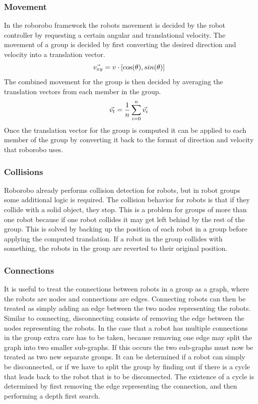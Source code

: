 	\subsubsection{Movement}
	In the roborobo framework the robots movement is decided by the robot controller by requesting a certain angular and translational velocity.
	The movement of a group is decided by first converting the desired direction and velocity into a translation vector.
	\begin{equation}
		\centering
		\vec{v_{xy}} = v\cdot[\cos(\theta), sin(\theta)]
	\end{equation}
	The combined movement for the group is then decided by averaging the translation vectors from each member in the group.
	\begin{equation}
		\centering
		\vec{v_t} = \frac{1}{n}\sum_{i=0}^{n} \vec{v_{i}}
	\end{equation}
	Once the translation vector for the group is computed it can be applied to each member of the group by converting it back to the format of direction and velocity that roborobo uses.
	
	\subsubsection{Collisions}
	Roborobo already performs collision detection for robots, but in robot groups some additional logic is required.
	The collision behavior for robots is that if they collide with a solid object, they stop.
	This is a problem for groups of more than one robot because if one robot collides it may get left behind by the rest of the group.
	This is solved by backing up the position of each robot in a group before applying the computed translation.
	If a robot in the group collides with something, the robots in the group are reverted to their original position.
	\subsubsection{Connections}
	It is useful to treat the connections between robots in a group as a graph, where the robots are nodes and connections are edges.
	Connecting robots can then be treated as simply adding an edge between the two nodes representing the robots.
	Similar to connecting, disconnecting consists of removing the edge between the nodes representing the robots.
	In the case that a robot has multiple connections in the group extra care has to be taken, because removing one edge may split the graph into two smaller sub-graphs.
	If this occurs the two sub-graphs must now be treated as two new separate groups.
	It can be determined if a robot can simply be disconnected, or if we have to split the group by finding out if there is a cycle that leads back to the robot that is to be disconnected.
	The existence of a cycle is determined by first removing the edge representing the connection, and then performing a depth first search.
	

